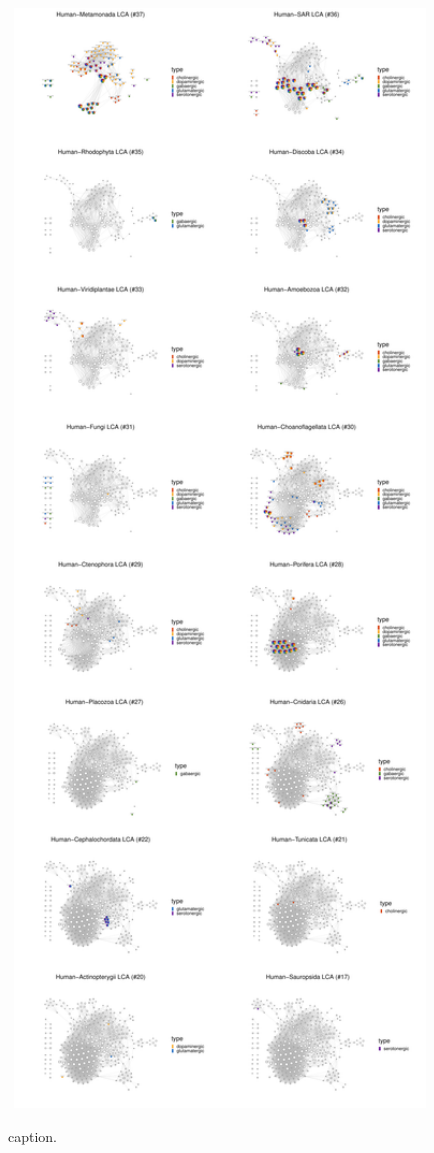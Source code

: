 \clearpage

\thispagestyle{empty}

\pdfpageheight=22in

\begin{figure}[p]

\caption{caption.}\label{fig:analysis.network.fig_sup_systems-1}

{\centering \includegraphics[width=7.5in, height=20in]{figs/analysis.network.fig_sup_systems-1} }

\end{figure}

